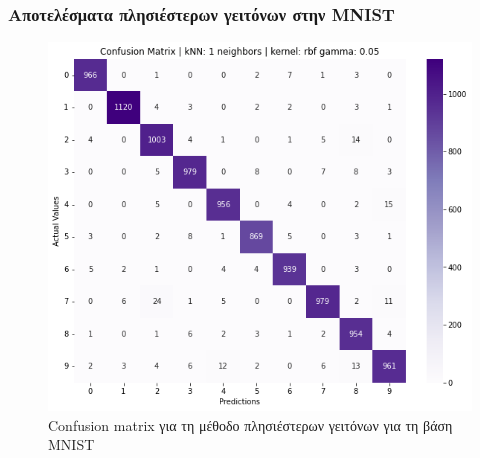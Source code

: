 \documentclass{beamer}
\begin{document}
\begin{frame}
\frametitle{Αποτελέσματα πλησιέστερων γειτόνων στην MNIST}

\begin{figure}[H]
    \centering
    \includegraphics[width=0.6\linewidth]{mnist/confusion_matrix_knn.png}
    \caption{Confusion matrix για τη μέθοδο πλησιέστερων γειτόνων για τη βάση
    MNIST}
    \label{fig:mnist_confusion_knn}
\end{figure}

\end{frame}
\end{document}
